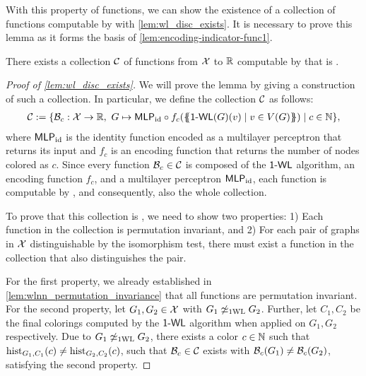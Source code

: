 With this property of \wlnn functions, we can show the existence of a \wldisc collection of functions computable by \wlnn with \cref{lem:wl_disc_exists}. It is necessary to prove this lemma as it forms the basis of \cref{lem:encoding-indicator-func1}.
\begin{lemma}\label{lem:wl_disc_exists}
    There exists a collection $\mathcal{C}$ of functions from $\mathcal{X}$ to $\mathbb{R}$ computable by \wlnn that is \wldisc.
\end{lemma}

\begin{proof}[Proof of \cref{lem:wl_disc_exists}]
    We will prove the lemma by giving a construction of such a collection. In particular, we define the collection $\mathcal{C}$ as follows:
    \begin{align*}
        \mathcal{C} := \{ \mathcal{B}_c: \mathcal{X} \rightarrow \mathbb{R}, \ G \mapsto \textsf{MLP}_\text{id} \circ f_c (\{\!\!\{ \textsf{1-WL}(G)(v) \mid v \in V(G) \}\!\!\}) \mid c \in \mathbb{N}\},
    \end{align*}
    where $\textsf{MLP}_\text{id}$ is the identity function encoded as a multilayer perceptron that returns its input and $f_c$ is an encoding function that returns the number of nodes colored as $c$. Since every function $\mathcal{B}_c \in \mathcal{C}$ is composed of the $\textsf{1-WL}$ algorithm, an encoding function $f_c$, and a multilayer perceptron $\textsf{MLP}_\text{id}$, each function is computable by \wlnn, and consequently, also the whole collection.
    
    To prove that this collection is \wldisc, we need to show two properties: 1) Each function in the collection is permutation invariant, and 2) For each pair of graphs in $\mathcal{X}$ distinguishable by the \wl isomorphism test, there must exist a function in the collection that also distinguishes the pair. 
    
    For the first property, we already established in \cref{lem:wlnn_permutation_invariance} that all \wlnn functions are permutation invariant. For the second property, let $G_1, G_2 \in \mathcal{X}$ with $G_1 \not\simeq_{\text{1WL}} G_2$. Further, let $C_1, C_2$ be the final colorings computed by the $\textsf{1-WL}$ algorithm when applied on $G_1, G_2$ respectively. Due to $G_1 \not\simeq_{\text{1WL}} G_2$, there exists a color $c \in \mathbb{N}$ such that $\operatorname{hist}_{G_1,C_1}(c) \neq \operatorname{hist}_{G_2,C_2}(c)$, such that $\mathcal{B}_c \in \mathcal{C}$ exists with $\mathcal{B}_c(G_1) \neq \mathcal{B}_c(G_2)$, satisfying the second property.
\end{proof}

